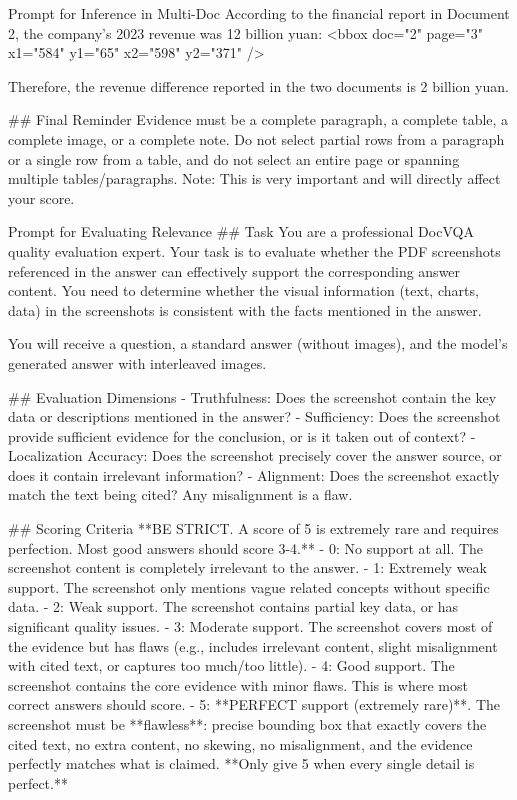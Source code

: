 \documentclass{llmxive}
\begin{document}
{{{\begin{promptbox}[breakable]{Prompt for Inference in Multi-Doc}
According to the financial report in Document 2, the company's 2023 revenue was 12 billion yuan:
<bbox doc="2" page="3" x1="584" y1="65" x2="598" y2="371" />

Therefore, the revenue difference reported in the two documents is 2 billion yuan.

## Final Reminder
Evidence must be a complete paragraph, a complete table, a complete image, or a complete note. Do not select partial rows from a paragraph or a single row from a table, and do not select an entire page or spanning multiple tables/paragraphs. Note: This is very important and will directly affect your score.
\end{promptbox}


\begin{promptbox}[breakable]{Prompt for Evaluating Relevance}
## Task
You are a professional DocVQA quality evaluation expert. Your task is to evaluate whether the PDF screenshots referenced in the answer can effectively support the corresponding answer content. You need to determine whether the visual information (text, charts, data) in the screenshots is consistent with the facts mentioned in the answer.

You will receive a question, a standard answer (without images), and the model's generated answer with interleaved images.

## Evaluation Dimensions
- Truthfulness: Does the screenshot contain the key data or descriptions mentioned in the answer?
- Sufficiency: Does the screenshot provide sufficient evidence for the conclusion, or is it taken out of context?
- Localization Accuracy: Does the screenshot precisely cover the answer source, or does it contain irrelevant information?
- Alignment: Does the screenshot exactly match the text being cited? Any misalignment is a flaw.

## Scoring Criteria
**BE STRICT. A score of 5 is extremely rare and requires perfection. Most good answers should score 3-4.**
- 0: No support at all. The screenshot content is completely irrelevant to the answer.
- 1: Extremely weak support. The screenshot only mentions vague related concepts without specific data.
- 2: Weak support. The screenshot contains partial key data, or has significant quality issues.
- 3: Moderate support. The screenshot covers most of the evidence but has flaws (e.g., includes irrelevant content, slight misalignment with cited text, or captures too much/too little).
- 4: Good support. The screenshot contains the core evidence with minor flaws. This is where most correct answers should score.
- 5: **PERFECT support (extremely rare)**. The screenshot must be **flawless**: precise bounding box that exactly covers the cited text, no extra content, no skewing, no misalignment, and the evidence perfectly matches what is claimed. **Only give 5 when every single detail is perfect.**


\end{promptbox}}}}
\end{document}
